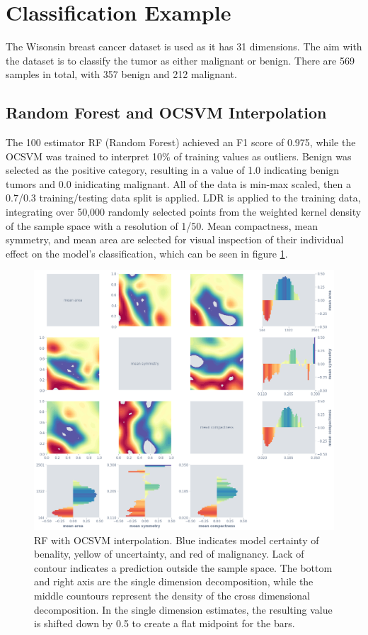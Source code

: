 \documentclass[a4paperpaper,twocolumn]{article}
\begin{document}
\section{Classification Example}

The Wisonsin breast cancer dataset is used as it has 31 dimensions. The aim with the dataset is to classify the tumor as either malignant or benign. There are 569 samples in total, with 357 benign and 212 malignant.

\subsection{Random Forest and OCSVM Interpolation}

The 100 estimator RF (Random Forest) achieved an F1 score of 0.975, while the OCSVM was trained to interpret 10\% of training values as outliers. Benign was selected as the positive category, resulting in a value of 1.0 indicating benign tumors and 0.0 inidicating malignant. All of the data is min-max scaled, then a 0.7/0.3 training/testing data split is applied. LDR is applied to the training data, integrating over 50,000 randomly selected points from the weighted kernel density of the sample space with a resolution of 1/50. Mean compactness, mean symmetry, and mean area are selected for visual inspection of their individual effect on the model's classification, which can be seen in figure \ref{fig:rf-ocsvm-matrix}.

\begin{figure}
\centering
\includegraphics[width=\columnwidth]{img/rf_ocsvm_matrix.png}
\caption{RF with OCSVM interpolation. Blue indicates model certainty of benality, yellow of uncertainty, and red of malignancy. Lack of contour indicates a prediction outside the sample space. The bottom and right axis are the single dimension decomposition, while the middle countours represent the density of the cross dimensional decomposition. In the single dimension estimates, the resulting value is shifted down by 0.5 to create a flat midpoint for the bars.}
\label{fig:rf-ocsvm-matrix}
\end{figure}
\end{document}
